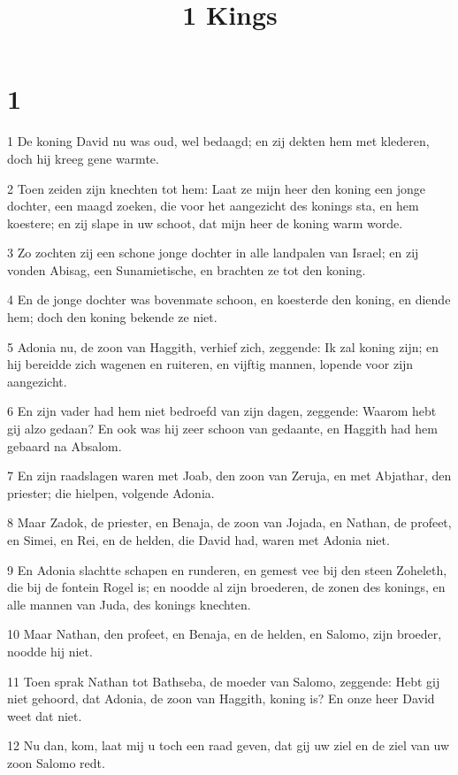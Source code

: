

\title{1 Kings}



\chapter{1}

\par 1 De koning David nu was oud, wel bedaagd; en zij dekten hem met klederen, doch hij kreeg gene warmte.
\par 2 Toen zeiden zijn knechten tot hem: Laat ze mijn heer den koning een jonge dochter, een maagd zoeken, die voor het aangezicht des konings sta, en hem koestere; en zij slape in uw schoot, dat mijn heer de koning warm worde.
\par 3 Zo zochten zij een schone jonge dochter in alle landpalen van Israel; en zij vonden Abisag, een Sunamietische, en brachten ze tot den koning.
\par 4 En de jonge dochter was bovenmate schoon, en koesterde den koning, en diende hem; doch den koning bekende ze niet.
\par 5 Adonia nu, de zoon van Haggith, verhief zich, zeggende: Ik zal koning zijn; en hij bereidde zich wagenen en ruiteren, en vijftig mannen, lopende voor zijn aangezicht.
\par 6 En zijn vader had hem niet bedroefd van zijn dagen, zeggende: Waarom hebt gij alzo gedaan? En ook was hij zeer schoon van gedaante, en Haggith had hem gebaard na Absalom.
\par 7 En zijn raadslagen waren met Joab, den zoon van Zeruja, en met Abjathar, den priester; die hielpen, volgende Adonia.
\par 8 Maar Zadok, de priester, en Benaja, de zoon van Jojada, en Nathan, de profeet, en Simei, en Rei, en de helden, die David had, waren met Adonia niet.
\par 9 En Adonia slachtte schapen en runderen, en gemest vee bij den steen Zoheleth, die bij de fontein Rogel is; en noodde al zijn broederen, de zonen des konings, en alle mannen van Juda, des konings knechten.
\par 10 Maar Nathan, den profeet, en Benaja, en de helden, en Salomo, zijn broeder, noodde hij niet.
\par 11 Toen sprak Nathan tot Bathseba, de moeder van Salomo, zeggende: Hebt gij niet gehoord, dat Adonia, de zoon van Haggith, koning is? En onze heer David weet dat niet.
\par 12 Nu dan, kom, laat mij u toch een raad geven, dat gij uw ziel en de ziel van uw zoon Salomo redt.
